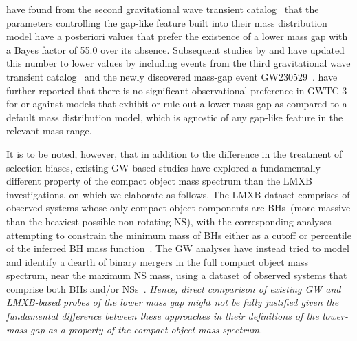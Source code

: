 \documentclass[modern]{aastex631}
\begin{document}
\cite{Farah:2021qom} have found from the second gravitational wave transient catalog~\citep{LIGOScientific:2020ibl} that the parameters controlling the gap-like feature built into their mass distribution model have a posteriori values that prefer the existence of a lower mass gap with a Bayes factor of 55.0 over its absence. Subsequent studies by \cite{KAGRA:2021duu} and \cite{LIGOScientific:2024elc} have updated this number to lower values by including events from the third gravitational wave transient catalog~\citep[GWTC-3,][]{KAGRA:2021vkt} and the newly discovered mass-gap event GW230529~\cite[a compact binary merger whose most massive component lies in the $3-5M_{\odot}$ mass range,][]{LIGOScientific:2024elc}. \cite{KAGRA:2021duu} have further reported that there is no significant observational preference in GWTC-3 for or against models that exhibit or rule out a lower mass gap as compared to a default mass distribution model, which is agnostic of any gap-like feature in the relevant mass range.


It is to be noted, however, that in addition to the difference in the treatment of selection biases, existing GW-based studies have explored a fundamentally different property of the compact object mass spectrum than the LMXB investigations, on which we elaborate as follows. The LMXB dataset comprises of observed systems whose only compact object components are BHs~(more massive than the heaviest possible non-rotating NS), with the corresponding analyses attempting to constrain the minimum mass of BHs either as a cutoff or percentile of the inferred BH mass function~\citep{Bailyn:1997xt, Ozel:2010su, Farr:2010tu}. The GW analyses have instead tried to model and identify a dearth of binary mergers in the full compact object mass spectrum, near the maximum NS mass, using a dataset of observed systems that comprise both BHs and/or NSs~\citep[i.e. including BNS systems,][]{Farah:2021qom, KAGRA:2021duu, LIGOScientific:2024elc}. \textit{Hence, direct comparison of existing GW and LMXB-based probes of the lower mass gap might not be fully justified given the fundamental difference between these approaches in their definitions of the lower-mass gap as a property of the compact object mass spectrum.} %
\end{document}
